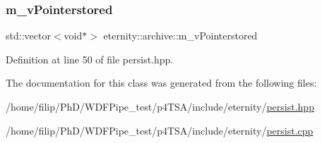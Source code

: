 \subsubsection{\texorpdfstring{m\+\_\+v\+Pointerstored}{m\_vPointerstored}}
{\footnotesize\ttfamily std\+::vector$<$void$\ast$$>$ eternity\+::archive\+::m\+\_\+v\+Pointerstored\hspace{0.3cm}{\ttfamily [protected]}}



Definition at line 50 of file persist.\+hpp.



The documentation for this class was generated from the following files\+:\begin{DoxyCompactItemize}
\item 
/home/filip/\+Ph\+D/\+W\+D\+F\+Pipe\+\_\+test/p4\+T\+S\+A/include/eternity/\hyperlink{persist_8hpp}{persist.\+hpp}\item 
/home/filip/\+Ph\+D/\+W\+D\+F\+Pipe\+\_\+test/p4\+T\+S\+A/include/eternity/\hyperlink{persist_8cpp}{persist.\+cpp}\end{DoxyCompactItemize}
